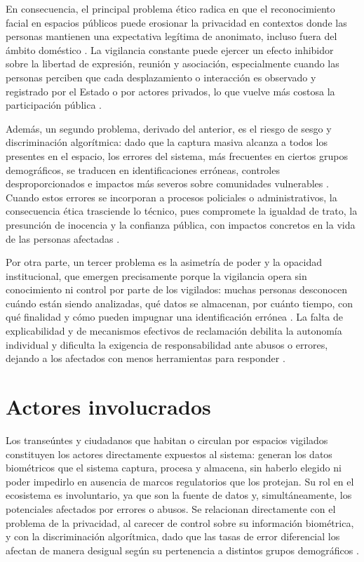 \documentclass[11pt, a4paper]{article}
\begin{document}
En consecuencia, el principal problema ético radica en que el reconocimiento facial en espacios públicos puede erosionar la privacidad en contextos donde las personas mantienen una expectativa legítima de anonimato, incluso fuera del ámbito doméstico \citep{silva2020, martinez2024}. La vigilancia constante puede ejercer un efecto inhibidor sobre la libertad de expresión, reunión y asociación, especialmente cuando las personas perciben que cada desplazamiento o interacción es observado y registrado por el Estado o por actores privados, lo que vuelve más costosa la participación pública \citep{schmechel2021}.

Además, un segundo problema, derivado del anterior, es el riesgo de sesgo y discriminación algorítmica: dado que la captura masiva alcanza a todos los presentes en el espacio, los errores del sistema, más frecuentes en ciertos grupos demográficos, se traducen en identificaciones erróneas, controles desproporcionados e impactos más severos sobre comunidades vulnerables \citep{schmechel2021, grother2019}. Cuando estos errores se incorporan a procesos policiales o administrativos, la consecuencia ética trasciende lo técnico, pues compromete la igualdad de trato, la presunción de inocencia y la confianza pública, con impactos concretos en la vida de las personas afectadas \citep{gimenez2022, schmechel2021}.

Por otra parte, un tercer problema es la asimetría de poder y la opacidad institucional, que emergen precisamente porque la vigilancia opera sin conocimiento ni control por parte de los vigilados: muchas personas desconocen cuándo están siendo analizadas, qué datos se almacenan, por cuánto tiempo, con qué finalidad y cómo pueden impugnar una identificación errónea \citep{martinez2024, silva2020}. La falta de explicabilidad y de mecanismos efectivos de reclamación debilita la autonomía individual y dificulta la exigencia de responsabilidad ante abusos o errores, dejando a los afectados con menos herramientas para responder \citep{gimenez2022}.

\section{Actores involucrados}

Los transeúntes y ciudadanos que habitan o circulan por espacios vigilados constituyen los actores directamente expuestos al sistema: generan los datos biométricos que el sistema captura, procesa y almacena, sin haberlo elegido ni poder impedirlo en ausencia de marcos regulatorios que los protejan. Su rol en el ecosistema es involuntario, ya que son la fuente de datos y, simultáneamente, los potenciales afectados por errores o abusos. Se relacionan directamente con el problema de la privacidad, al carecer de control sobre su información biométrica, y con la discriminación algorítmica, dado que las tasas de error diferencial los afectan de manera desigual según su pertenencia a distintos grupos demográficos \citep{schmechel2021, laux2024}.
\end{document}
